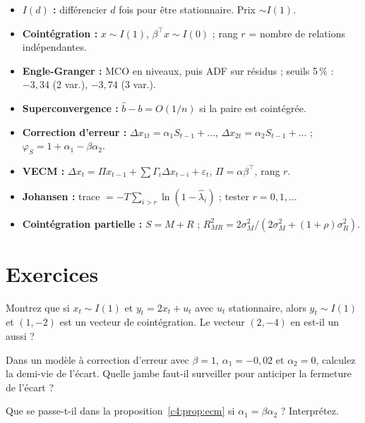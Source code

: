 \begin{whiteboard}
\begin{itemize}[leftmargin=1.2em]
\item \textbf{$I(d)$ :} différencier $d$ fois pour être stationnaire. Prix $\sim I(1)$.
\item \textbf{Cointégration :} $x\sim I(1)$, $\beta^\top x\sim I(0)$ ; rang $r$ = nombre de relations indépendantes.
\item \textbf{Engle-Granger :} MCO en niveaux, puis ADF sur résidus ; seuils 5\,\% : $-3{,}34$ (2 var.), $-3{,}74$ (3 var.).
\item \textbf{Superconvergence :} $\hat b - b = O(1/n)$ si la paire est cointégrée.
\item \textbf{Correction d'erreur :} $\Delta x_{1t} = \alpha_1S_{t-1}+\dots$, $\Delta x_{2t} = \alpha_2S_{t-1}+\dots$ ; $\varphi_S = 1+\alpha_1-\beta\alpha_2$.
\item \textbf{VECM :} $\Delta x_t = \Pi x_{t-1} + \sum\Gamma_i\Delta x_{t-i} + \varepsilon_t$, $\Pi = \alpha\beta^\top$, rang $r$.
\item \textbf{Johansen :} trace $= -T\sum_{i>r}\ln(1-\hat\lambda_i)$ ; tester $r = 0, 1, \dots$
\item \textbf{Cointégration partielle :} $S = M + R$ ; $R^2_{MR} = 2\sigma_M^2/(2\sigma_M^2 + (1+\rho)\sigma_R^2)$.
\end{itemize}
\end{whiteboard}

\section{Exercices}

\begin{exercise}
Montrez que si $x_t\sim I(1)$ et $y_t = 2x_t + u_t$ avec $u_t$ stationnaire, alors $y_t\sim I(1)$ et $(1,-2)$ est un vecteur de cointégration. Le vecteur $(2,-4)$ en est-il un aussi ?
\end{exercise}

\begin{exercise}
Dans un modèle à correction d'erreur avec $\beta = 1$, $\alpha_1 = -0{,}02$ et $\alpha_2 = 0$, calculez la demi-vie de l'écart. Quelle jambe faut-il surveiller pour anticiper la fermeture de l'écart ?
\end{exercise}

\begin{exercise}
Que se passe-t-il dans la proposition~\ref{c4:prop:ecm} si $\alpha_1 = \beta\alpha_2$ ? Interprétez.
\end{exercise}


